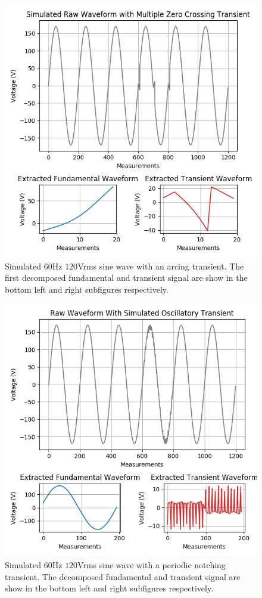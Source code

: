 \documentclass[10pt,conference,compsocconf]{IEEEtran}
\begin{document}
\begin{figure}[htbp]
\centering%
\includegraphics[scale=0.35]{./figures/mult_z_crossing_sim.png}
\caption{Simulated $60$Hz $120$Vrms sine wave with an arcing transient. The first decomposed fundamental and transient signal are show in the bottom left and right subfigures respectively.}\label{fig:ArcingSim}
\end{figure}


\begin{figure}[htbp]
\centering%
\includegraphics[scale=0.35]{./figures/notching_sim.png}
\caption{Simulated $60$Hz $120$Vrms sine wave with a periodic notching transient. The decomposed fundamental and transient signal are show in the bottom left and right subfigures respectively.}\label{fig:NotchingSim}
\end{figure}
\end{document}
